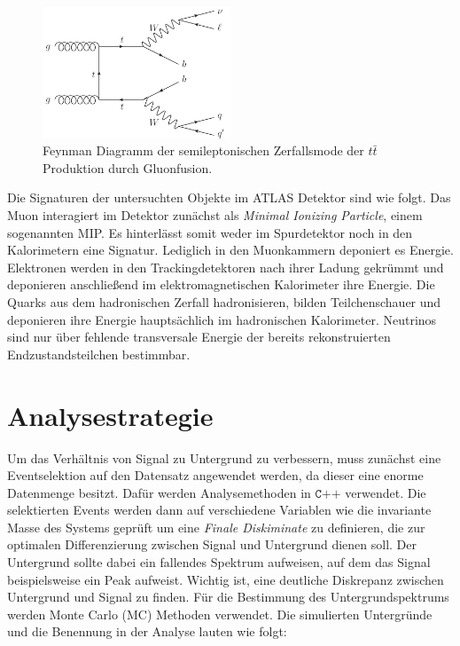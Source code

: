 \begin{figure}[h]
  \centering
  \includegraphics[width=0.5\textwidth]{content/graphics/pictures/Gluonfusion.png}
  \caption{Feynman Diagramm der semileptonischen Zerfallsmode der $t\bar{t}$ Produktion durch Gluonfusion.}
  \label{fig:gluonfusion}
\end{figure}

Die Signaturen der untersuchten Objekte im ATLAS Detektor sind wie folgt. Das Muon interagiert im Detektor zunächst als \textit{Minimal Ionizing Particle},
einem sogenannten MIP. Es hinterlässt somit weder im Spurdetektor noch in den Kalorimetern eine Signatur. Lediglich in den Muonkammern deponiert es
Energie. Elektronen werden in den Trackingdetektoren nach ihrer Ladung gekrümmt und deponieren anschließend im elektromagnetischen Kalorimeter ihre
Energie. Die Quarks aus dem hadronischen Zerfall hadronisieren, bilden Teilchenschauer und deponieren ihre Energie hauptsächlich im hadronischen Kalorimeter. Neutrinos sind nur über fehlende
transversale Energie der bereits rekonstruierten Endzustandsteilchen bestimmbar.

\section{Analysestrategie}
\label{sec:strategie}
Um das Verhältnis von Signal zu Untergrund zu verbessern, muss zunächst eine Eventselektion auf den Datensatz angewendet werden, da dieser eine enorme
Datenmenge besitzt. Dafür werden Analysemethoden in $\texttt{C++}$ verwendet. Die selektierten Events werden dann auf verschiedene Variablen wie die
invariante Masse des Systems geprüft um eine \textit{Finale Diskiminate} zu definieren, die zur optimalen Differenzierung zwischen Signal und
Untergrund dienen soll. Der Untergrund sollte dabei ein fallendes Spektrum aufweisen, auf dem das Signal beispielsweise ein Peak aufweist. Wichtig ist, 
eine deutliche Diskrepanz zwischen Untergrund und Signal zu finden. Für die
Bestimmung des Untergrundspektrums werden Monte Carlo (MC) Methoden verwendet. Die simulierten Untergründe und die Benennung in der Analyse lauten
wie folgt:

